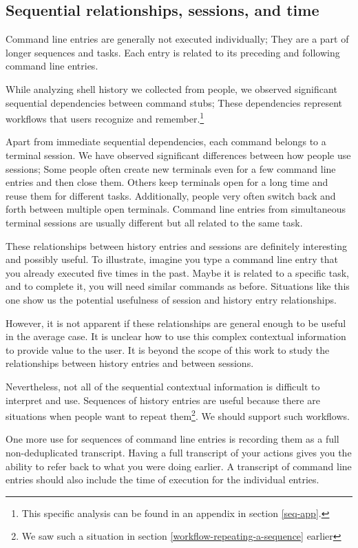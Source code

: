 \subsection{Sequential relationships, sessions, and time}

Command line entries are generally not executed individually; They are a part of longer sequences and tasks.\cite{greenberg1993computer} Each entry is related to its preceding and following command line entries. 

While analyzing shell history we collected from people, we observed significant sequential dependencies between command stubs; These dependencies represent workflows that users recognize and remember.\footnote{This specific analysis can be found in an appendix in section \ref{seq-app}.}

Apart from immediate sequential dependencies, each command belongs to a terminal session. We have observed significant differences between how people use sessions; Some people often create new terminals even for a few command line entries and then close them. Others keep terminals open for a long time and reuse them for different tasks.
Additionally, people very often switch back and forth between multiple open terminals. Command line entries from simultaneous terminal sessions are usually different but all related to the same task.

These relationships between history entries and sessions are definitely interesting and possibly useful. To illustrate, imagine you type a command line entry that you already executed five times in the past. Maybe it is related to a specific task, and to complete it, you will need similar commands as before. Situations like this one show us the potential usefulness of session and history entry relationships.

However, it is not apparent if these relationships are general enough to be useful in the average case. It is unclear how to use this complex contextual information to provide value to the user. It is beyond the scope of this work to study the relationships between history entries and between sessions.

Nevertheless, not all of the sequential contextual information is difficult to interpret and use. Sequences of history entries are useful because there are situations when people want to repeat them\footnote{We saw such a situation in section \ref{workflow-repeating-a-sequence} earlier}. We should support such workflows.

One more use for sequences of command line entries is recording them as a full non-deduplicated transcript. Having a full transcript of your actions gives you the ability to refer back to what you were doing earlier. A transcript of command line entries should also include the time of execution for the individual entries.

